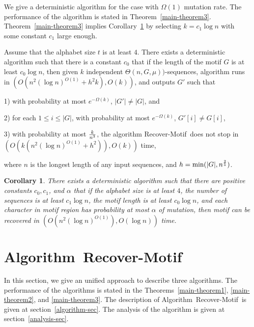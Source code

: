 \documentclass[11pt]{article}
\newtheorem{corollaryfoo}[theoremfoo]{Corollary}
\newenvironment{corollary}{\pagebreak[1]\begin{corollaryfoo}}{\end{corollaryfoo}}
\newcommand{\algmnam}{Recover-Motif}
\newcommand{\algmname}{Algorithm~\algmnam}
\newcommand{\algma}{\algmname~}
\begin{document}
We give a deterministic algorithm for the case with $\Omega(1)$
mutation rate.  The performance of the algorithm is stated in
Theorem~\ref{main-theorem3}. Theorem~\ref{main-theorem3} implies
Corollary~\ref{corollary3} by selecting $k=c_1\log n$ with some
constant $c_1$ large enough.

\begin{theorem}\label{main-theorem3}Assume that the alphabet size $t$ is at least $4$. There
exists a deterministic
algorithm such that there is a constant $c_0$ that if the length of
the motif $G$ is at least $c_0\log n$, then given $k$ independent
$\Theta(n,G,\mu))$-sequences, algorithm runs in $(O(n^2(\log
n)^{O(1)}+h^2k), O(k))$, and outputs $G'$ such that

1) with probability at most $e^{-\Omega(k)}$, $|G'|\not=|G|$, and

2) for each $1\le i\le |G|$, with probability at most
$e^{-\Omega(k)}$, $G'[i]\not=G[i]$,

3)  with probability at most ${k\over n^3}$, the algorithm
\algmnam~does not stop in $(O(k(n^2(\log n)^{O(1)}+h^2)), O(k))$
time,

 where $n$ is the longest length of any input
sequences, and $h=\min(|G|,n^{2\over 5})$.
\end{theorem}

\begin{corollary}\label{corollary3}
There exists a deterministic algorithm such that there are positive
constants $c_0, c_1$, and $\alpha$ that if the alphabet size is at
least $4$, the number of sequences is at least $c_1\log n$, the
motif length is at least $c_0\log n$, and each character in motif
region has probability at most $\alpha$ of mutation, then motif can
be recovered in $(O({n^2}(\log n)^{O(1)}), O(\log n))$ time.
\end{corollary}










\section{\algmname}
In this section, we give an unified approach to describe three
algorithms. The performance of the algorithms is stated in the
Theorems~\ref{main-theorem1}, \ref{main-theorem2}, and
\ref{main-theorem3}. The description of \algma is given at
section~\ref{algorithm-sec}. The analysis of the algorithm is given
at section~\ref{analysis-sec}.
\end{document}
